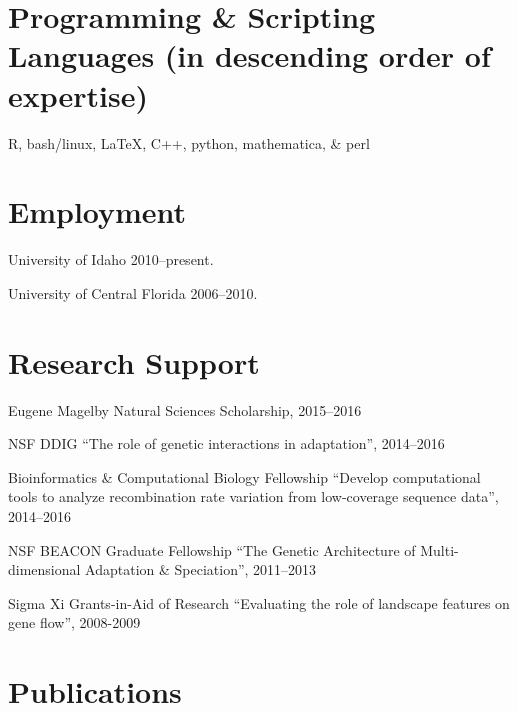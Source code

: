 \documentclass[letterpaper]{article}
\renewenvironment{itemize}{
  \begin{list}{}{
    \setlength{\leftmargin}{1.5em}
  }
}{
  \end{list}
}
\begin{document}
\section*{Programming \& Scripting Languages (in descending order of expertise)}
\begin{itemize}
\item R, bash/linux, \LaTeX, C++, python, mathematica, \& perl 
\end{itemize}

\section*{Employment}

\begin{itemize}
\item University of Idaho 2010--present.
\item University of Central Florida 2006--2010.
\end{itemize}

\section*{Research Support}
\begin{itemize}
\item Eugene Magelby Natural Sciences Scholarship, 2015--2016
\item NSF DDIG ``The role of genetic interactions in adaptation'', 2014--2016
\item Bioinformatics \& Computational Biology Fellowship ``Develop computational tools to analyze recombination rate variation from low-coverage sequence data'', 2014--2016
\item NSF BEACON Graduate Fellowship ``The Genetic Architecture of Multi-dimensional Adaptation \& Speciation'', 2011--2013
\item Sigma Xi Grants-in-Aid of Research ``Evaluating the role of landscape features on gene flow'', 2008-2009
\end{itemize}


\section*{Publications}
\end{document}
